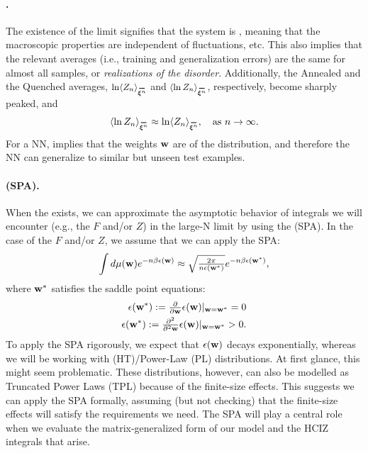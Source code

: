 \paragraph{\SelfAveraging.}
The existence of the limit signifies that the system is \emph{\SelfAveraging}, meaning that
the macroscopic properties are independent of fluctuations, etc.
This also implies that the relevant averages
(i.e., training and generalization errors) are the same for almost all samples, or \emph{realizations of the disorder}.
Additionally, the Annealed and the Quenched averages,
$\ln \langle Z_n \rangle_{\AVGNDXIn}$ and $\langle \ln Z_n \rangle_{\AVGNDXIn}$, respectively,
become sharply peaked, and
\begin{align}
\langle \ln Z_n \rangle_{\AVGNDXIn} \approx \ln \langle Z_n \rangle_{\AVGNDXIn}, \quad \text{as } n \to \infty .
\end{align}
For a NN, \SelfAveraging implies that the weights ${\mathbf{w}}$ are \emph{\Typical} of the distribution,
and therefore the NN can generalize to similar but unseen test examples.

\paragraph{\SaddlePointApproximation (SPA).}
When the \ThermodynamicLimit exists, we can approximate the asymptotic behavior of integrals we will encounter (e.g., the \FreeEnergy $F$ and/or \PartitionFunction $Z$) in the large-N limit by using the \SaddlePointApproximation (SPA).
In the case of the $F$ and/or $Z$, we assume that we can apply the SPA:
\begin{align}
  \label{eqn:SPA}
  \int d\mu({\mathbf{w}}) e^{-n\beta\epsilon({\mathbf{w}})}\approx \sqrt{\tfrac{2\pi}{n\epsilon({\mathbf{w}}^{*})}} e^{-n\beta\epsilon({\mathbf{w}}^{*})}  ,
\end{align}
where ${\mathbf{w}}^{*}$ satisfies the saddle point equations:
\begin{align}
  \epsilon({\mathbf{w}}^{*}):=\tfrac{\partial}{\partial {\mathbf{w}}}\epsilon({\mathbf{w}})\vert_{{\mathbf{w}}={\mathbf{w}}^{*}}=0 \\
  \epsilon({\mathbf{w}}^{*}):=\tfrac{\partial^{2}}{\partial^{2} {\mathbf{w}}}\epsilon({\mathbf{w}})\vert_{{\mathbf{w}}={\mathbf{w}}^{*}}>0  .
\end{align}
To apply the SPA rigorously, we expect that $\epsilon({\mathbf{w}})$ decays exponentially,
whereas we will be working with \HeavyTailed (HT)/Power-Law (PL) distributions.
At first glance, this might seem problematic.
These distributions, however, can also be modelled as Truncated Power Laws (TPL) because of the finite-size effects. 
This suggests we can apply the SPA formally, assuming (but not checking) that the finite-size effects will satisfy the requirements we need.
The SPA will play a central role when we evaluate the matrix-generalized form of our model and the HCIZ integrals that arise.

